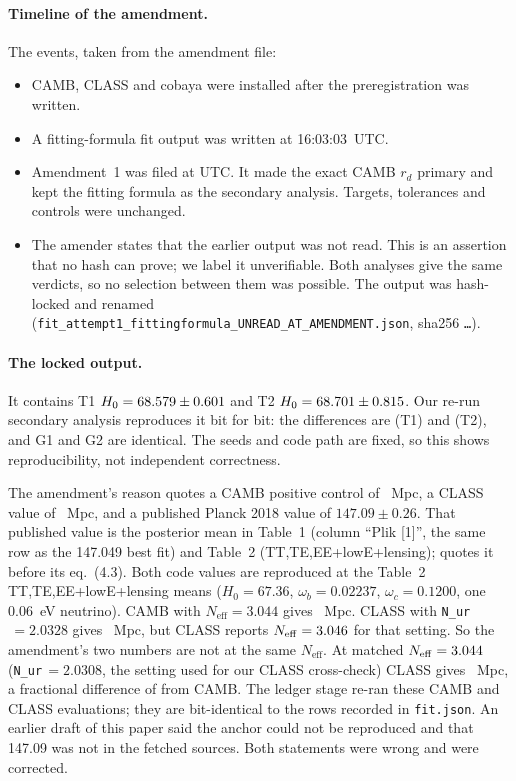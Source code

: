 \documentclass[11pt]{article}
\begin{document}
\paragraph{Timeline of the amendment.}
The events, taken from the amendment file:
\begin{itemize}
\item CAMB, CLASS and cobaya were installed after the preregistration was
  written.
\item A fitting-formula fit output was written at 16:03:03~UTC.
\item Amendment~1 was filed at \AmendTime{} UTC. It made the exact CAMB
  $r_d$ primary and kept the fitting formula as the secondary analysis.
  Targets, tolerances and controls were unchanged.
\item The amender states that the earlier output was not read. This is an
  assertion that no hash can prove; we label it unverifiable. Both
  analyses give the same verdicts, so no selection between them was
  possible. The output was
  hash-locked and renamed
  (\texttt{fit\_attempt1\_fittingformula\_UNREAD\_AT\_AMENDMENT.json},
  sha256 \texttt{\LockedSha\ldots}).
\end{itemize}

\paragraph{The locked output.}
It contains T1 $H_0=68.579\pm0.601$ and T2
$H_0=68.701\pm0.815$. Our re-run secondary analysis
reproduces it bit for bit: the differences are \LockedDiffOne{} (T1) and
\LockedDiffTwo{} (T2), and G1 and G2 are identical. The seeds and code path
are fixed, so this shows reproducibility, not independent correctness.

The amendment's reason quotes a CAMB positive control of \CambOrch~Mpc, a
CLASS value of \ClassOrch~Mpc, and a published Planck 2018 value of
$147.09\pm0.26$. That published value is the posterior mean in
\cite{planck2018} Table~1 (column ``Plik [1]'', the same row as the
147.049 best fit) and Table~2 (TT,TE,EE+lowE+lensing); \cite{desi2024vi}
quotes it before its eq.~(4.3). Both code values are reproduced at the
Table~2 TT,TE,EE+lowE+lensing means ($H_0=67.36$, $\omega_b=0.02237$,
$\omega_c=0.1200$, one 0.06~eV neutrino). CAMB with $N_\mathrm{eff}=3.044$
gives \AnchorCambTwo~Mpc. CLASS with \texttt{N\_ur}$\,=2.0328$ gives
\AnchorClassTwo~Mpc, but CLASS reports $N_\mathrm{eff}=3.046$
for that setting. So the amendment's two numbers are not at the same
$N_\mathrm{eff}$. At matched $N_\mathrm{eff}=3.044$
(\texttt{N\_ur}$\,=2.0308$, the setting used for our CLASS cross-check)
CLASS gives \AnchorClassMatched~Mpc, a fractional difference of
\AnchorMatchedFrac{} from CAMB. The ledger stage re-ran these CAMB and
CLASS evaluations; they are bit-identical to the rows recorded in
\texttt{fit.json}. An earlier draft of this paper said the anchor could not
be reproduced and that 147.09 was not in the fetched sources. Both
statements were wrong and were corrected.
\end{document}
